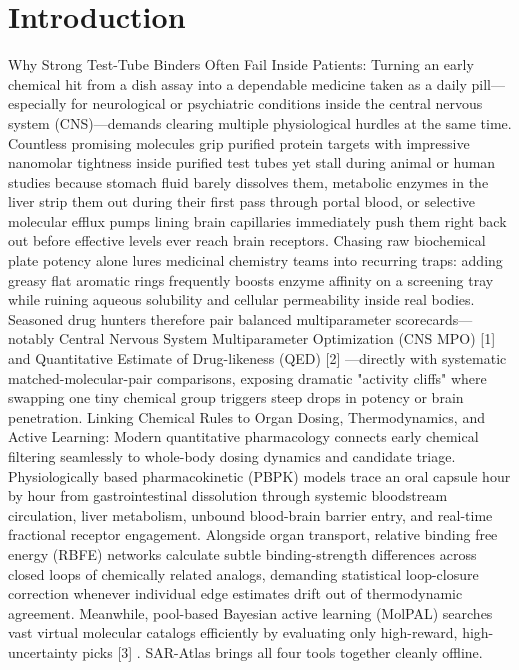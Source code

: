 \documentclass[10pt,letterpaper]{article}
\begin{document}
\section{Introduction}
Why Strong Test-Tube Binders Often Fail Inside Patients: Turning an early chemical hit from a dish assay into a dependable medicine taken as a daily pill---especially for neurological or psychiatric conditions inside the central nervous system (CNS)---demands clearing multiple physiological hurdles at the same time. Countless promising molecules grip purified protein targets with impressive nanomolar tightness inside purified test tubes yet stall during animal or human studies because stomach fluid barely dissolves them, metabolic enzymes in the liver strip them out during their first pass through portal blood, or selective molecular efflux pumps lining brain capillaries immediately push them right back out before effective levels ever reach brain receptors. Chasing raw biochemical plate potency alone lures medicinal chemistry teams into recurring traps: adding greasy flat aromatic rings frequently boosts enzyme affinity on a screening tray while ruining aqueous solubility and cellular permeability inside real bodies. Seasoned drug hunters therefore pair balanced multiparameter scorecards---notably Central Nervous System Multiparameter Optimization (CNS MPO) [1] and Quantitative Estimate of Drug-likeness (QED) [2] ---directly with systematic matched-molecular-pair comparisons, exposing dramatic "activity cliffs" where swapping one tiny chemical group triggers steep drops in potency or brain penetration. Linking Chemical Rules to Organ Dosing, Thermodynamics, and Active Learning: Modern quantitative pharmacology connects early chemical filtering seamlessly to whole-body dosing dynamics and candidate triage. Physiologically based pharmacokinetic (PBPK) models trace an oral capsule hour by hour from gastrointestinal dissolution through systemic bloodstream circulation, liver metabolism, unbound blood-brain barrier entry, and real-time fractional receptor engagement. Alongside organ transport, relative binding free energy (RBFE) networks calculate subtle binding-strength differences across closed loops of chemically related analogs, demanding statistical loop-closure correction whenever individual edge estimates drift out of thermodynamic agreement. Meanwhile, pool-based Bayesian active learning (MolPAL) searches vast virtual molecular catalogs efficiently by evaluating only high-reward, high-uncertainty picks [3] . SAR-Atlas brings all four tools together cleanly offline.
\end{document}

